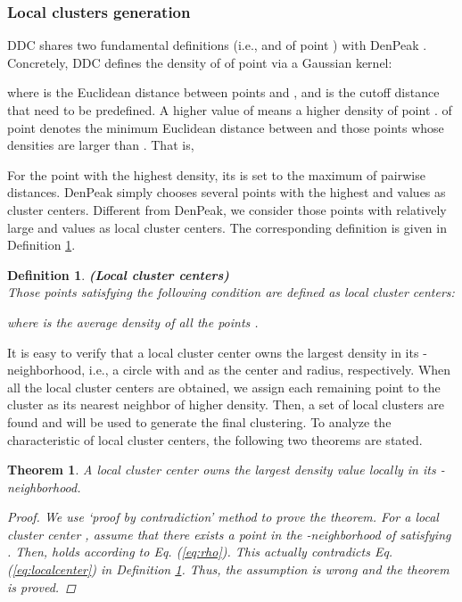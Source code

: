 \documentclass[10pt,twocolumn,letterpaper]{article}
\newtheorem{theorem}{Theorem}
\newtheorem{definition}{Definition}
\begin{document}
\subsubsection{Local clusters generation}
DDC shares two fundamental definitions (i.e.,  and  of point ) with DenPeak \cite{rodriguez2014clustering}. Concretely, DDC defines the density of  of point  via a Gaussian kernel: 

where  is the Euclidean distance between points  and , and  is the cutoff distance that need to be predefined.
A higher value of  means a higher density of point .
 of point  denotes the minimum Euclidean distance between  and those points whose densities are larger than . That is, 


For the point with the highest density, its  is set to the maximum of pairwise distances.
DenPeak simply chooses several points with the highest  and  values as cluster centers. Different from DenPeak, we consider those points with relatively large  and  values as local cluster centers. The corresponding definition is given in Definition \ref{def:local}.
\begin{definition}\label{def:local}
\textbf{(Local cluster centers)} \\Those points satisfying the following condition are defined as local cluster centers:

where  is the average density of all the points . 
\end{definition}
It is easy to verify that a local cluster center  owns the largest density in its -neighborhood, i.e., a circle with  and  as the center and radius, respectively. 
When all the local cluster centers are obtained, we assign each remaining point to the cluster as its nearest neighbor of higher density. Then, a set of local clusters are found and will be used to generate the final clustering. To analyze the characteristic of local cluster centers, the following two theorems are stated.

\begin{theorem}\label{the:center_density}
A local cluster center  owns the largest density value  locally in its -neighborhood.
\begin{proof}
We use `proof by contradiction' method to prove the theorem.
For a local cluster center , assume that there exists a point  in the -neighborhood of  satisfying . Then,  holds according to Eq. (\ref{eq:rho}). This actually contradicts Eq. (\ref{eq:localcenter}) in Definition \ref{def:local}. Thus, the assumption is wrong and the theorem is proved.
\end{proof}
\end{theorem}
\end{document}
